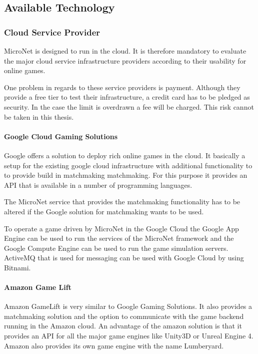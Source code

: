 \subsection{Available Technology}

\subsubsection{Cloud Service Provider}

MicroNet is designed to run in the cloud. It is therefore mandatory to evaluate
the major cloud service infrastructure providers according to their usability
for online games.

One problem in regards to these service providers is payment. Although they
provide a free tier to test their infrastructure, a credit card has to be
pledged as security. In the case the limit is overdrawn a fee will be charged.
This risk cannot be taken in this thesis. 

\paragraph{Google Cloud Gaming Solutions}

Google offers a solution to deploy rich online games in the cloud. It basically
a setup for the existing google cloud infrastructure with additional
functionality to to provide build in matchmaking matchmaking. For this purpose
it provides an API that is available in a number of programming languages.

The MicroNet service that provides the matchmaking functionality has to be
altered if the Google solution for matchmaking wants to be used. 

To operate a game driven by MicroNet in the Google Cloud the Google App Engine
can be used to run the services of the MicroNet framework and the Google Compute
Engine can be used to run the game simulation servers. ActiveMQ that is used for
messaging can be used with Google Cloud by using Bitnami.

\paragraph{Amazon Game Lift}

Amazon GameLift is very similar to Google Gaming Solutions. It also provides a
matchmaking solution and the option to communicate with the game backend running
in the Amazon cloud. An advantage of the amazon solution is that it provides an
API for all the major game engines like Unity3D or Unreal Engine 4. Amazon also
provides its own game engine with the name Lumberyard.

